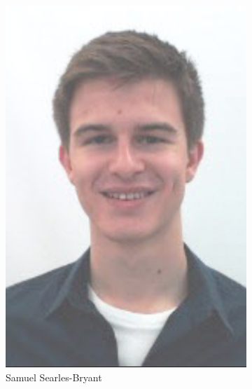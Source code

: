 \begin{figure}
\begin{subfigure}[b]{0.45\textwidth}
        \includegraphics[height=0.3\textheight]{Files/SSB}
        \caption{Samuel Searles-Bryant}
    \end{subfigure}\\
    \vspace{0.5cm}
    \begin{subfigure}[b]{0.45\textwidth}
        \centering

\end{subfigure}
\end{figure}
